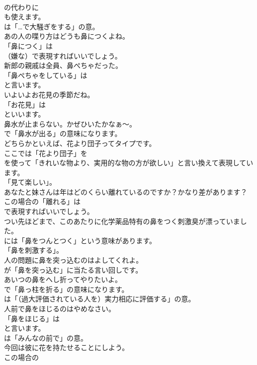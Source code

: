 \documentclass[8pt]{extreport}
\begin{document}
\begin{CJK}{UTF8}{min}
\\	の代わりに 
\\	も使えます。
\\	は「…で大騒ぎをする」の意。	
\\	あの人の喋り方はどうも鼻につくよね。 
\\	「鼻につく」は 
\\	（嫌な）で表現すればいいでしょう。	
\\	新郎の親戚は全員、鼻ぺちゃだった。 
\\	「鼻ぺちゃをしている」は
\\	と言います。	
\\	いよいよお花見の季節だね。 
\\	「お花見」は
\\	といいます。	
\\	鼻水が止まらない。かぜひいたかなぁ～。 
\\	で「鼻水が出る」の意味になります。	
\\	どちらかといえば、花より団子ってタイプです。 
\\	ここでは「花より団子」を
\\	を使って「きれいな物より、実用的な物の方が欲しい」と言い換えて表現しています。
\\	「見て楽しい」。	
\\	あなたと妹さんは年はどのくらい離れているのですか？かなり差があります？ 
\\	この場合の「離れる」は 
\\	で表現すればいいでしょう。	
\\	つい先ほどまで、このあたりに化学薬品特有の鼻をつく刺激臭が漂っていました。 
\\	には「鼻をつんとつく」という意味があります。
\\	「鼻を刺激する」。	
\\	人の問題に鼻を突っ込むのはよしてくれよ。 
\\	が「鼻を突っ込む」に当たる言い回しです。	
\\	あいつの鼻をへし折ってやりたいよ。 
\\	で「鼻っ柱を折る」の意味になります。
\\	は「（過大評価されている人を）実力相応に評価する」の意。	
\\	人前で鼻をほじるのはやめなさい。 
\\	「鼻をほじる」は 
\\	と言います。
\\	は「みんなの前で」の意。	
\\	今回は彼に花を持たせることにしよう。 
\\	この場合の

\end{CJK}
\end{document}
